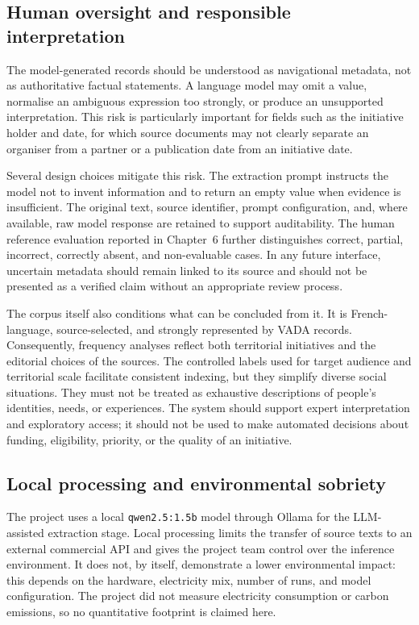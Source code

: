 \subsection{Human oversight and responsible interpretation}

The model-generated records should be understood as navigational metadata, not
as authoritative factual statements. A language model may omit a value,
normalise an ambiguous expression too strongly, or produce an unsupported
interpretation. This risk is particularly important for fields such as the
initiative holder and date, for which source documents may not clearly separate
an organiser from a partner or a publication date from an initiative date.

Several design choices mitigate this risk. The extraction prompt instructs the
model not to invent information and to return an empty value when evidence is
insufficient. The original text, source identifier, prompt configuration, and,
where available, raw model response are retained to support auditability. The
human reference evaluation reported in Chapter~6 further distinguishes correct,
partial, incorrect, correctly absent, and non-evaluable cases. In any future
interface, uncertain metadata should remain linked to its source and should not
be presented as a verified claim without an appropriate review process.

The corpus itself also conditions what can be concluded from it. It is
French-language, source-selected, and strongly represented by VADA records.
Consequently, frequency analyses reflect both territorial initiatives and the
editorial choices of the sources. The controlled labels used for target audience
and territorial scale facilitate consistent indexing, but they simplify diverse
social situations. They must not be treated as exhaustive descriptions of
people's identities, needs, or experiences. The system should support expert
interpretation and exploratory access; it should not be used to make automated
decisions about funding, eligibility, priority, or the quality of an initiative.

\subsection{Local processing and environmental sobriety}

The project uses a local \texttt{qwen2.5:1.5b} model through Ollama for the
LLM-assisted extraction stage. Local processing limits the transfer of source
texts to an external commercial API and gives the project team control over the
inference environment. It does not, by itself, demonstrate a lower environmental
impact: this depends on the hardware, electricity mix, number of runs, and model
configuration. The project did not measure electricity consumption or carbon
emissions, so no quantitative footprint is claimed here.

